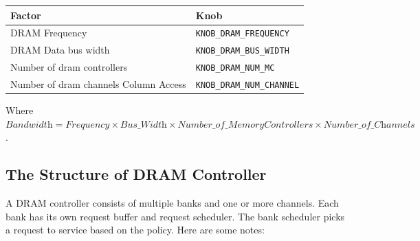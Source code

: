 \begin{center}
\vspace{0.2in}
\begin{footnotesize}
\begin{tabular}{l l}
Factor                                       & Knob 				     \\ \hline \hline
DRAM Frequency                      		 & \Verb+KNOB_DRAM_FREQUENCY+ \\
DRAM Data bus width                  	 	 & \Verb+KNOB_DRAM_BUS_WIDTH+  \\
Number of dram controllers            		 & \Verb+KNOB_DRAM_NUM_MC+    \\
Number of dram channels Column Access	 	 & \Verb+KNOB_DRAM_NUM_CHANNEL+    \\
\end{tabular}
\end{footnotesize}
\end{center}

\vspace{0.2in}
\noindent
Where $\textit{Bandwidth} = \textit{Frequency} \times \textit{Bus\_Width} \times 
	  \textit{Number\_of\_MemoryControllers} \times \textit{Number\_of\_Channels}$.
	  
\subsection{The Structure of DRAM Controller}

A DRAM controller consists of multiple banks and one or more channels.
Each bank has its own request buffer and request scheduler. The bank
scheduler picks a request to service based on the policy. Here are
some notes:

